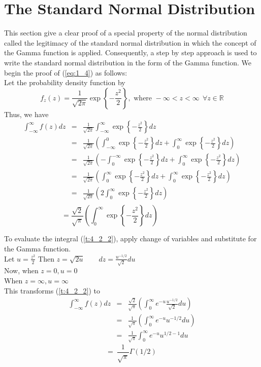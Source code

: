 \documentclass[11pt]{report}
\newcommand{\sps}{\\[0.2cm]}
\newcommand{\refn}[1]{(\ref{#1})}
\newcommand{\refx}[1]{\refn{eq:#1}}
\newcommand{\dsp}{\displaystyle}
\newcommand{\NI}{\noindent}
\newcommand{\real}{ \mathbb{R}}
\begin{document}
	
	\section{The Standard Normal Distribution}
	This section give a clear proof of a special property of the normal distribution called the legitimacy of the standard normal distribution in which the concept of the Gamma function is applied. Consequently, a step by step approach is used to write the standard normal distribution in the form of the Gamma function. We begin the proof of \refx{1_4} as follows:\sps
	Let the probability density function by
	\begin{equation}
		f_z(z) = \frac{1}{\sqrt{2\pi}}\exp\left\{-\frac{z^2}{2}\right\}, \text{ where } -\infty < z <\infty~~ \forall z \in \real \tag{1}\label{t:4_2_1}
	\end{equation}
	Thus, we have
	\begin{eqnarray*}
		\int_{-\infty}^\infty f(z) dz &=& \frac{1}{\sqrt{2\pi}}\int_{-\infty}^\infty \exp\left\{-\frac{z^2}{2}\right\}dz\sps
		&=& \frac{1}{\sqrt{2\pi}}\left(\int_{-\infty}^{0} \exp\left\{-\frac{z^2}{2}\right\}dz + \int_{0}^{\infty} \exp\left\{-\frac{z^2}{2}\right\}dz \right)\sps
		&=& \frac{1}{\sqrt{2\pi}}\left(-\int_{0}^{-\infty} \exp\left\{-\frac{z^2}{2}\right\}dz + \int_{0}^{\infty} \exp\left\{-\frac{z^2}{2}\right\}dz \right)\sps
		&=& \frac{1}{\sqrt{2\pi}}\left(\int_{0}^{\infty} \exp\left\{-\frac{z^2}{2}\right\}dz + \int_{0}^{\infty} \exp\left\{-\frac{z^2}{2}\right\}dz \right)\sps
		&=& \frac{1}{\sqrt{2\pi}}\left(2\int_{0}^{\infty} \exp\left\{-\frac{z^2}{2}\right\}dz \right)\sps
	\end{eqnarray*}
	\begin{equation}
		=  \frac{\sqrt{2}}{\sqrt{\pi}}\left(\int_{0}^{\infty} \exp\left\{-\frac{z^2}{2}\right\}dz \right)\qquad\qquad\qquad~\tag{2}\label{t:4_2_2}
	\end{equation}
	
	\NI To evaluate the integral \refn{t:4_2_2}, apply change of variables and substitute for the Gamma function.\\
	
	\NI Let $\dsp u=\frac{z^2}{2}$ \quad Then $\dsp z=\sqrt{2u}\qquad dz=\frac{u^{-1/2}}{\sqrt{2}}du$\\
	
	\NI Now, when $z=0, u=0$\\
	When $z=\infty, u=\infty$\\
	
	\NI This transforms \refn{t:4_2_2} to 
	\begin{eqnarray*}
		\int_{-\infty}^\infty f(z) dz &=& \frac{\sqrt{2}}{\sqrt{\pi}}\left(\int_{0}^{\infty} e^{-u} \frac{u^{-1/2}}{\sqrt{2}}du\right)\sps
		&=& \frac{1}{\sqrt{\pi}}\left(\int_0^\infty e^{-u}u^{-1/2}du\right)\sps
		&=& \frac{1}{\sqrt{\pi}}\int_0^\infty e^{-u}u^{1/2 - 1}du
	\end{eqnarray*}
	\begin{equation}
		=~ \frac{1}{\sqrt{\pi}}\Gamma\left(1/2\right)~\tag{3}\label{t:4_2_3}
	\end{equation}
	
\end{document}

